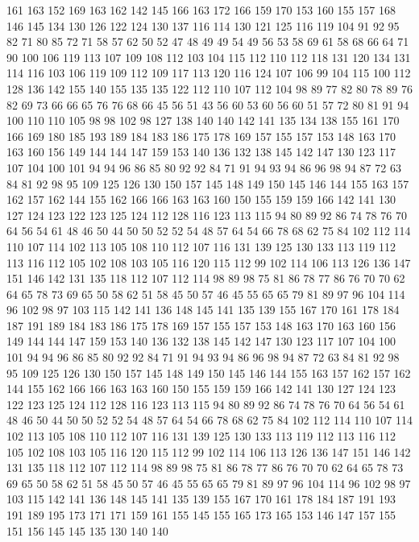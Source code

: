 161 163 152 169 163 162 142 145 166 163 172 166 159 170 153 160 155 157 168 146
145 134 130 126 122 124 130 137 116 114 130 121 125 116 119 104 91 92 95 82
71 80 85 72 71 58 57 62 50 52 47 48 49 49 54 49 56 53 58 69
61 58 68 66 64 71 90 100 106 119 113 107 109 108 112 103 104 115 112 110
112 118 131 120 134 131 114 116 103 106 119 109 112 109 117 113 120 116 124 107
106 99 104 115 100 112 128 136 142 155 140 155 135 135 122 112 110 107 112 104
98 89 77 82 80 78 89 76 82 69 73 66 66 65 76 76 68 66 45 56
51 43 56 60 53 60 56 60 51 57 72 80 81 91 94 100 110 110 105 98
98 102 98 127 138 140 140 142 141 135 134 138 155 161 170 166 169 180 185 193
189 184 183 186 175 178 169 157 155 157 153 148 163 170 163 160 156 149 144 144
147 159 153 140 136 132 138 145 142 147 130 123 117 107 104 100 101 94 94 96
86 85 80 92 92 84 71 91 94 93 94 86 96 98 94 87 72 63 84 81
92 98 95 109 125 126 130 150 157 145 148 149 150 145 146 144 155 163 157 162
157 162 144 155 162 166 166 163 163 160 150 155 159 159 166 142 141 130 127 124
123 122 123 125 124 112 128 116 123 113 115 94 80 89 92 86 74 78 76 70
64 56 54 61 48 46 50 44 50 50 52 52 54 48 57 64 54 66 78 68
62 75 84 102 112 114 110 107 114 102 113 105 108 110 112 107 116 131 139 125
130 133 113 119 112 113 116 112 105 102 108 103 105 116 120 115 112 99 102 114
106 113 126 136 147 151 146 142 131 135 118 112 107 112 114 98 89 98 75 81
86 78 77 86 76 70 70 62 64 65 78 73 69 65 50 58 62 51 58 45
50 57 46 45 55 65 65 79 81 89 97 96 104 114 96 102 98 97 103 115
142 141 136 148 145 141 135 139 155 167 170 161 178 184 187 191 189 184 183 186
175 178 169 157 155 157 153 148 163 170 163 160 156 149 144 144 147 159 153 140
136 132 138 145 142 147 130 123 117 107 104 100 101 94 94 96 86 85 80 92
92 84 71 91 94 93 94 86 96 98 94 87 72 63 84 81 92 98 95 109
125 126 130 150 157 145 148 149 150 145 146 144 155 163 157 162 157 162 144 155
162 166 166 163 163 160 150 155 159 159 166 142 141 130 127 124 123 122 123 125
124 112 128 116 123 113 115 94 80 89 92 86 74 78 76 70 64 56 54 61
48 46 50 44 50 50 52 52 54 48 57 64 54 66 78 68 62 75 84 102
112 114 110 107 114 102 113 105 108 110 112 107 116 131 139 125 130 133 113 119
112 113 116 112 105 102 108 103 105 116 120 115 112 99 102 114 106 113 126 136
147 151 146 142 131 135 118 112 107 112 114 98 89 98 75 81 86 78 77 86
76 70 70 62 64 65 78 73 69 65 50 58 62 51 58 45 50 57 46 45
55 65 65 79 81 89 97 96 104 114 96 102 98 97 103 115 142 141 136 148
145 141 135 139 155 167 170 161 178 184 187 191 193 191 189 195 173 171 171 159
161 155 145 155 165 173 165 153 146 147 157 155 151 156 145 145 135 130 140 140
